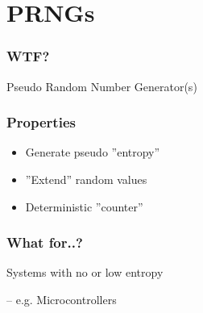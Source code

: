 \section{PRNGs}

\begin{frame}
	\frametitle{WTF?}
	\large{Pseudo Random Number Generator(s)}
\end{frame}

\begin{frame}
	\frametitle{Properties}
	\begin{itemize}
		\item<1-> Generate pseudo ''entropy''
		\item<2-> ''Extend'' random values
		\item<3-> Deterministic ''counter''
	\end{itemize}
\end{frame}

\begin{frame}
	\frametitle{What for..?}
	Systems with no or low entropy
	\par
	-- e.g. Microcontrollers
	
\end{frame}